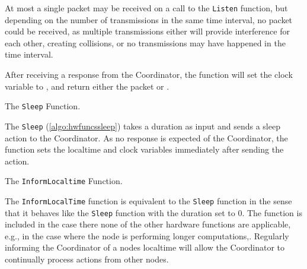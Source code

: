 At most a single packet may be received on a call to the \texttt{Listen} function, but depending on the number of transmissions in the same time interval, no packet could be received, as multiple transmissions either will provide interference for each other, creating collisions, or no transmissions may have happened in the time interval.

After receiving a response from the Coordinator, the function will set the clock variable to \KwNow, and return either the packet or \KwNull. \medbreak

\begin{algorithm}[ht]
    \DontPrintSemicolon
    
    
    \caption{The \texttt{Sleep} Function.}
    \label{algo:hwfuncssleep}
\end{algorithm}

The \texttt{Sleep} (\autoref{algo:hwfuncssleep}) takes a duration as input and sends a sleep action to the Coordinator. As no response is expected of the Coordinator, the function sets the localtime and clock variables immediately after sending the action. \medbreak

\begin{algorithm}[ht]
    \DontPrintSemicolon
    
    
    \caption{The \texttt{InformLocaltime} Function.}
    \label{algo:hwfuncsupdatelocaltime}
\end{algorithm}

The \texttt{InformLocalTime} function is equivalent to the \texttt{Sleep} function in the sense that it behaves like the \texttt{Sleep} function with the duration set to 0. The function is included in the case there none of the other hardware functions are applicable, e.g., in the case where the node is performing longer computations,. Regularly informing the Coordinator of a nodes localtime will allow the Coordinator to continually process actions from other nodes.
